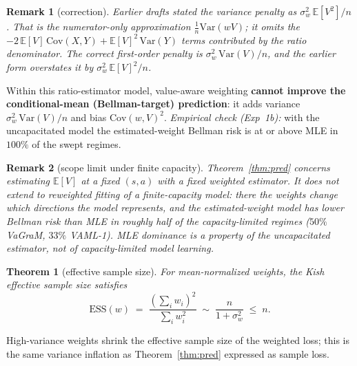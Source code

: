 \documentclass[11pt]{article}
\newtheorem{theorem}{Theorem}
\newtheorem{remark}{Remark}
\begin{document}
\begin{remark}[correction]
Earlier drafts stated the variance penalty as $\sigma_w^2\,\mathbb{E}[V^2]/n$. That is
the numerator-only approximation $\frac{1}{n}\mathrm{Var}(wV)$; it omits the
$-2\,\mathbb{E}[V]\,\mathrm{Cov}(X,Y) + \mathbb{E}[V]^2\,\mathrm{Var}(Y)$ terms
contributed by the ratio denominator. The correct first-order penalty is
$\sigma_w^2\,\mathrm{Var}(V)/n$, and the earlier form overstates it by
$\sigma_w^2\,\mathbb{E}[V]^2/n$.
\end{remark}

Within this ratio-estimator model, value-aware weighting \textbf{cannot improve the
conditional-mean (Bellman-target) prediction}: it adds variance
$\sigma_w^2\,\mathrm{Var}(V)/n$ and bias $\mathrm{Cov}(w,V)^2$. \emph{Empirical check
(Exp~1b):} with the uncapacitated model the estimated-weight Bellman risk is at or above
MLE in $100\%$ of the swept regimes.

\begin{remark}[scope limit under finite capacity]
\label{rem:scope}
Theorem~\ref{thm:pred} concerns estimating $\mathbb{E}[V]$ at a fixed $(s,a)$ with a
\emph{fixed} weighted estimator. It does \emph{not} extend to reweighted fitting of a
\emph{finite-capacity} model: there the weights change which directions the model
represents, and the estimated-weight model has \emph{lower} Bellman risk than MLE in
roughly half of the capacity-limited regimes ($50\%$ VaGraM, $33\%$ VAML-1). MLE
dominance is a property of the uncapacitated estimator, not of capacity-limited model
learning.
\end{remark}

\begin{theorem}[effective sample size]
\label{thm:ess}
For mean-normalized weights, the Kish effective sample size satisfies
\begin{equation}
  \mathrm{ESS}(w) \;=\; \frac{\left(\sum_i w_i\right)^2}{\sum_i w_i^2}
  \;\sim\; \frac{n}{1 + \sigma_w^2} \;\le\; n.
\end{equation}
\end{theorem}

High-variance weights shrink the effective sample size of the weighted loss; this is the
same variance inflation as Theorem~\ref{thm:pred} expressed as sample loss.
\end{document}

